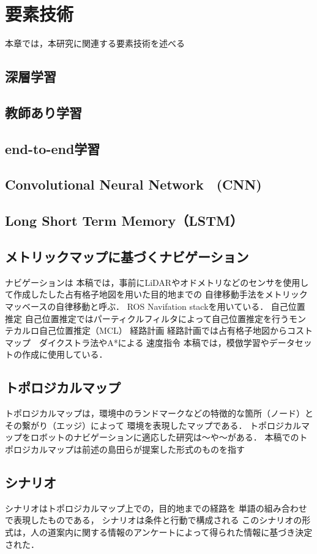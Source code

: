 \section{要素技術}
本章では，本研究に関連する要素技術を述べる
\subsection{深層学習}
\subsection{教師あり学習}
\subsection{end-to-end学習}
\subsection{Convolutional Neural Network　(CNN)}
\subsection{Long Short Term Memory（LSTM）}
\subsection{メトリックマップに基づくナビゲーション}
ナビゲーションは
本稿では，事前にLiDARやオドメトリなどのセンサを使用して作成したした占有格子地図を用いた目的地までの
自律移動手法をメトリックマッベースの自律移動と呼ぶ．
ROS Navifation stackを用いている．
自己位置推定
自己位置推定ではパーティクルフィルタによって自己位置推定を行うモンテカルロ自己位置推定（MCL）
経路計画
経路計画では占有格子地図からコストマップ　ダイクストラ法やA*による
速度指令
本稿では，模倣学習やデータセットの作成に使用している．
\subsection{トポロジカルマップ}
トポロジカルマップは，環境中のランドマークなどの特徴的な箇所（ノード）とその繋がり（エッジ）によって
環境を表現したマップである．
トポロジカルマップをロボットのナビゲーションに適応した研究は〜や〜がある．
本稿でのトポロジカルマップは前述の島田らが提案した形式のものを指す

\subsection{シナリオ}
シナリオはトポロジカルマップ上での，目的地までの経路を
単語の組み合わせで表現したものである，
シナリオは条件と行動で構成される
このシナリオの形式は，人の道案内に関する情報のアンケートによって得られた情報に基づき決定された．

